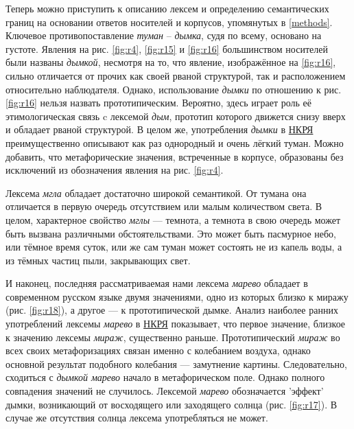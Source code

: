\par Теперь можно приступить к описанию лексем и определению семантических границ на основании ответов носителей и корпусов, упомянутых в \ref{methods}. Ключевое противопоставление \textit{туман} -- \textit{дымка}, судя по всему, основано на густоте. Явления на рис. \ref{fig:r4}, \ref{fig:r15} и \ref{fig:r16} большинством носителей были названы \textit{дымкой}, несмотря на то, что явление, изображённое на \ref{fig:r16}, сильно отличается от прочих как своей рваной структурой, так и расположением относительно наблюдателя. Однако, использование \textit{дымки} по отношению к рис. \ref{fig:r16} нельзя назвать прототипическим. Вероятно, здесь играет роль её этимологическая связь c лексемой \textit{дым}, прототип которого движется снизу вверх и обладает рваной структурой. В целом же, употребления \textit{дымки} в \hyperlink{ruscorpora}{НКРЯ} преимущественно описывают как раз однородный и очень лёгкий туман. Можно добавить, что метафорические значения, встреченные в корпусе, образованы без исключений из обозначения явления на рис. \ref{fig:r4}.

\par Лексема \textit{мгла} обладает достаточно широкой семантикой. От тумана она отличается в первую очередь отсутствием или малым количеством света. В целом, характерное свойство \textit{мглы} --- темнота, а темнота в свою очередь может быть вызвана различными обстоятельствами. Это может быть пасмурное небо, или тёмное время суток, или же сам туман может состоять не из капель воды, а из тёмных частиц пыли, закрывающих свет.

\par И наконец, последняя рассматриваемая нами лексема \textit{марево} обладает в современном русском языке двумя значениями, одно из которых близко к миражу (рис. \ref{fig:r18}), а другое --- к прототипической дымке. Анализ наиболее ранних употреблений лексемы \textit{марево} в \hyperlink{ruscorpora}{НКРЯ} показывает, что первое значение, близкое к значению лексемы \textit{мираж}, существенно раньше. Прототипический \textit{мираж} во всех своих метафоризациях связан именно с колебанием воздуха, однако основной результат подобного колебания --- замутнение картины. Следовательно, сходиться с \textit{дымкой марево} начало в метафорическом поле.
Однако полного совпадения значений не случилось. Лексемой \textit{марево} обозначается 'эффект' дымки, возникающий от восходящего или заходящего солнца (рис. \ref{fig:r17}). В случае же отсутствия солнца лексема употребляться не может.


